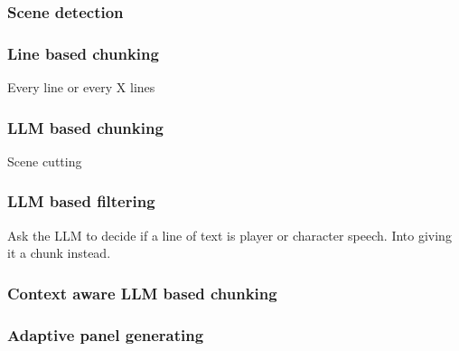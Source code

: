 \subsubsection{Scene detection}

\subsubsection{Line based chunking}
Every line or every X lines

\subsubsection{LLM based chunking}
Scene cutting

\subsubsection{LLM based filtering}
Ask the LLM to decide if a line of text is player or character speech. Into giving it a chunk instead.

\subsubsection{Context aware LLM based chunking}

\subsubsection{Adaptive panel generating}